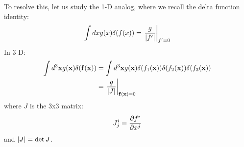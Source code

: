 To resolve this, let us study the 1-D analog, where we recall the delta function identity:
\begin{equation}
    \int dx g(x) \delta(f(x))  = \left.\frac{g}{\lvert f' \rvert}\right|_{f'=0}
\end{equation}
In 3-D:
\begin{equation}
    \begin{split}
        \int d^3\mathbf{x}g(\mathbf{x})\delta(\mathbf{f}(\mathbf{x})) &= \int d^3\mathbf{x}g(\mathbf{x})\delta(f_1(\mathbf{x}))\delta(f_2(\mathbf{x}))\delta(f_3(\mathbf{x}))
        \\ &= \left.\frac{g}{\lvert J \rvert}\right|_{\mathbf{f}(\mathbf{x}) = 0}
    \end{split}
\end{equation}
where $J$ is the 3x3 matrix:
\begin{equation}
    J^i_{j} = \frac{\partial f^i}{\partial x^j}
\end{equation}
and $\lvert J \rvert = \det J$.

